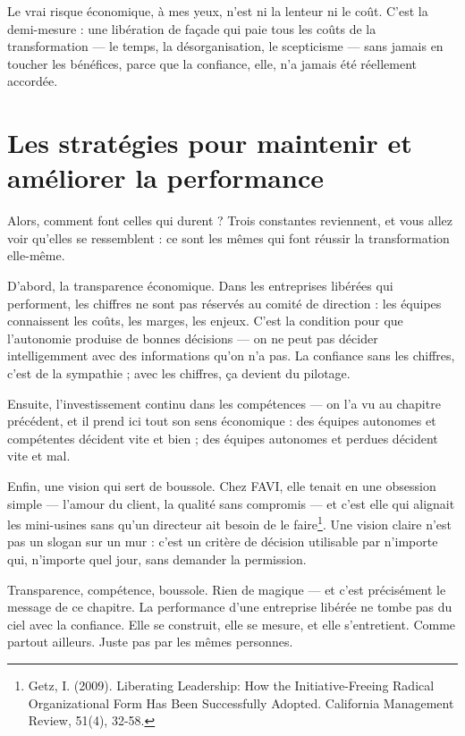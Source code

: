 Le vrai risque économique, à mes yeux, n'est ni la lenteur ni le coût. C'est la demi-mesure : une libération de façade qui paie tous les coûts de la transformation — le temps, la désorganisation, le scepticisme — sans jamais en toucher les bénéfices, parce que la confiance, elle, n'a jamais été réellement accordée.

\section{Les stratégies pour maintenir et améliorer la performance}

Alors, comment font celles qui durent ? Trois constantes reviennent, et vous allez voir qu'elles se ressemblent : ce sont les mêmes qui font réussir la transformation elle-même.

D'abord, la transparence économique. Dans les entreprises libérées qui performent, les chiffres ne sont pas réservés au comité de direction : les équipes connaissent les coûts, les marges, les enjeux. C'est la condition pour que l'autonomie produise de bonnes décisions — on ne peut pas décider intelligemment avec des informations qu'on n'a pas. La confiance sans les chiffres, c'est de la sympathie ; avec les chiffres, ça devient du pilotage.

Ensuite, l'investissement continu dans les compétences — on l'a vu au chapitre précédent, et il prend ici tout son sens économique : des équipes autonomes et compétentes décident vite et bien ; des équipes autonomes et perdues décident vite et mal.

Enfin, une vision qui sert de boussole. Chez FAVI, elle tenait en une obsession simple — l'amour du client, la qualité sans compromis — et c'est elle qui alignait les mini-usines sans qu'un directeur ait besoin de le faire\footnote{Getz, I. (2009). Liberating Leadership: How the Initiative-Freeing Radical Organizational Form Has Been Successfully Adopted. California Management Review, 51(4), 32-58.}. Une vision claire n'est pas un slogan sur un mur : c'est un critère de décision utilisable par n'importe qui, n'importe quel jour, sans demander la permission.

Transparence, compétence, boussole. Rien de magique — et c'est précisément le message de ce chapitre. La performance d'une entreprise libérée ne tombe pas du ciel avec la confiance. Elle se construit, elle se mesure, et elle s'entretient. Comme partout ailleurs. Juste pas par les mêmes personnes.
